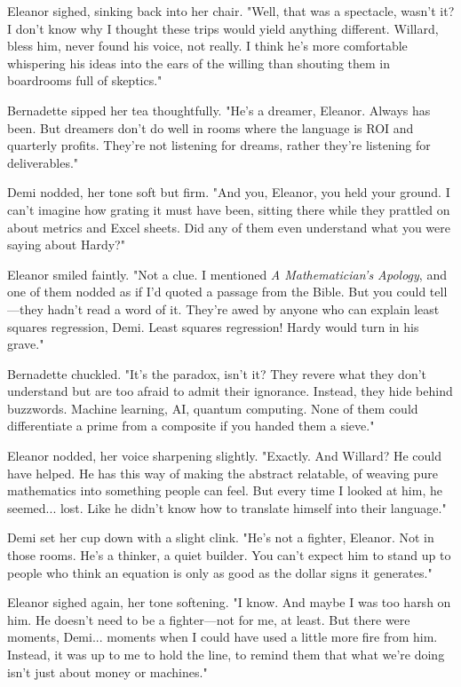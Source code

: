 \smallskip

Eleanor sighed, sinking back into her chair. "Well, that was a spectacle, wasn’t it? I don’t know why I thought these trips would yield anything different. Willard, bless him, never found his voice, not really. I think he’s more comfortable whispering his ideas into the ears of the willing than shouting them in boardrooms full of skeptics."
\smallskip

Bernadette sipped her tea thoughtfully. "He’s a dreamer, Eleanor. Always has been. But dreamers don’t do well in rooms where the language is ROI and quarterly profits. They’re not listening for dreams, rather they’re listening for deliverables."
\smallskip

Demi nodded, her tone soft but firm. "And you, Eleanor, you held your ground. I can’t imagine how grating it must have been, sitting there while they prattled on about metrics and Excel sheets. Did any of them even understand what you were saying about Hardy?"
\smallskip

Eleanor smiled faintly. "Not a clue. I mentioned \textit{ A Mathematician’s Apology}, and one of them nodded as if I’d quoted a passage from the Bible. But you could tell—they hadn’t read a word of it. They’re awed by anyone who can explain least squares regression, Demi. Least squares regression! Hardy would turn in his grave."
\smallskip

Bernadette chuckled. "It’s the paradox, isn’t it? They revere what they don’t understand but are too afraid to admit their ignorance. Instead, they hide behind buzzwords. Machine learning, AI, quantum computing. None of them could differentiate a prime from a composite if you handed them a sieve."
\smallskip

Eleanor nodded, her voice sharpening slightly. "Exactly. And Willard? He could have helped. He has this way of making the abstract relatable, of weaving pure mathematics into something people can feel. But every time I looked at him, he seemed... lost. Like he didn’t know how to translate himself into their language."
\smallskip

Demi set her cup down with a slight clink. "He’s not a fighter, Eleanor. Not in those rooms. He’s a thinker, a quiet builder. You can’t expect him to stand up to people who think an equation is only as good as the dollar signs it generates."
\smallskip

Eleanor sighed again, her tone softening. "I know. And maybe I was too harsh on him. He doesn’t need to be a fighter—not for me, at least. But there were moments, Demi... moments when I could have used a little more fire from him. Instead, it was up to me to hold the line, to remind them that what we’re doing isn’t just about money or machines."
\smallskip

